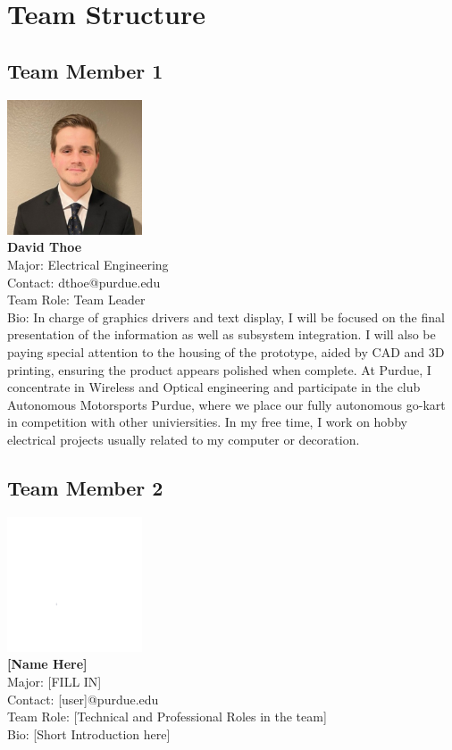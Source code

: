 
\clearpage
\section{Team Structure}
\subsection{Team Member 1}
\includegraphics[height=4cm]{images/david.jpg} \\
\textbf{David Thoe}\\
Major: Electrical Engineering\\
Contact: dthoe@purdue.edu\\
Team Role: Team Leader \\
Bio: In charge of graphics drivers and text display, I will be focused on the final presentation of the information as well as subsystem integration.  
I will also be paying special attention to the housing of the prototype, aided by CAD and 3D printing, ensuring the product appears polished when complete.
At Purdue, I concentrate in Wireless and Optical engineering and participate in the club Autonomous Motorsports Purdue, where we place our fully autonomous go-kart in competition with other univiersities.  
In my free time, I work on hobby electrical projects usually related to my computer or decoration. 

\subsection{Team Member 2}
\includegraphics[height=4cm]{images/white.png} \\
\textbf{[Name Here]}\\
Major: [FILL IN]\\
Contact: [user]@purdue.edu\\
Team Role: [Technical and Professional Roles in the team] \\
Bio: [Short Introduction here]

